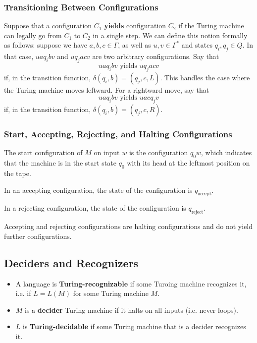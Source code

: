 \documentclass[letterpaper]{article}
\begin{document}
\subsubsection{Transitioning Between Configurations}
Suppose that a configuration $C_1$ \textbf{yields} configuration $C_2$ if the Turing machine can legally go from $C_1$ to $C_2$ in a single step. We can define this notion formally as follows: suppose we have $a, b, c \in \Gamma$, as well as $u, v \in \Gamma^*$ and states $q_i, q_j \in Q$. In that case, $ua q_i bv$ and $uq_j acv$ are two arbitrary configurations. Say that 
\[uaq_i bv \text{ yields } uq_j acv\]
if, in the transition function, $\delta(q_i, b) = (q_j, c, L)$. This handles the case where the Turing machine moves leftward. For a rightward move, say that 
\[uaq_i bv \text{ yields } uacq_j v\]
if, in the transition function, $\delta(q_i, b) = (q_j, c, R)$. 

\subsubsection{Start, Accepting, Rejecting, and Halting Configurations}
The start configuration of $M$ on input $w$ is the configuration $q_0 w$, which indicates that the machine is in the start state $q_0$ with its head at the leftmost position on the tape.

\bigskip 

In an accepting configuration, the state of the configuration is $q_{\text{accept}}$.

\bigskip 

In a rejecting configuration, the state of the configuration is $q_{\text{reject}}$.

\bigskip 

Accepting and rejecting configurations are halting configurations and do not yield further configurations. 

\subsection{Deciders and Recognizers}
\begin{itemize}
    \item A language is \textbf{Turing-recognizable} if some Turoing machine recognizes it, i.e. if $L = L(M)$ for some Turing machine $M$. 
    \item $M$ is a \textbf{decider} Turing machine if it halts on all inputs (i.e. never loops).
    \item $L$ is \textbf{Turing-decidable} if some Turing machine that is a decider recognizes it. 
\end{itemize}
\end{document}
